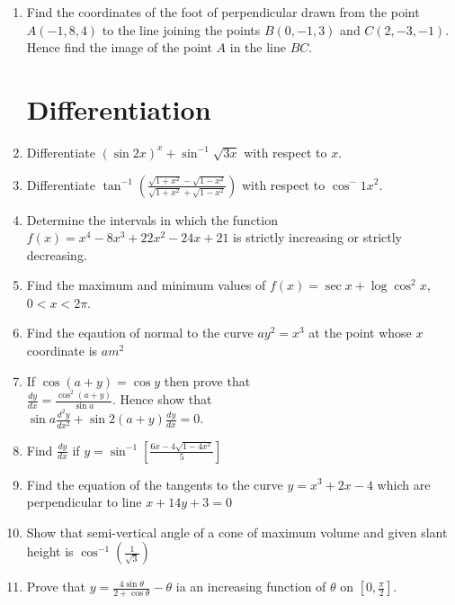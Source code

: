 \documentclass[12pt,-letter paper]{article}
\providecommand{\brak}[1]{\ensuremath{\left(#1\right)}}
\providecommand{\sbrak}[1]{\ensuremath{{}\left[#1\right]}}
\providecommand{\brak}[1]{\ensuremath{\left(#1\right)}}
\begin{document}
\begin{enumerate}
	\item Find the coordinates of the foot of perpendicular drawn from the point
$A(-1, 8, 4)$ to the line joining the points $B(0, -1, 3)$ and $C(2,-3,-1)$. Hence
find the image of the point $A$ in the line $BC$.

	

\section{Differentiation}
	\item Differentiate $(\sin 2x)^x + \sin^{-1} \sqrt{3x}$ with respect to $x$.
	
	\item Differentiate $\tan^{-1} \brak{\frac{\sqrt{1 + x^2}-\sqrt{1-x^2}}{\sqrt{1+x^2}+\sqrt{1-x^2}}}$
with respect to $\cos^-1 x^2$.

	\item Determine the intervals in which the function $f (x) = x^4 - 8x^3 + 22x^2 - 24x+21$ is strictly increasing or strictly decreasing.

	\item Find the maximum and minimum values of $f (x) = \sec x + \log \cos^2 x$, $0 < x < 2\pi$.

	\item Find the eqaution of normal to the curve $ay^2 = x^3$ at the point whose $x$ coordinate is $am^2$
	
	
	\item If $\cos(a+y) = \cos y$ then prove that \\
$\frac{dy}{dx} = \frac{\cos^{2}(a+y)}{\sin a}$. 
Hence show that \\
$\sin a \frac{d^{2}y}{dx^{2}} + \sin 2(a+y)\frac{dy}{dx} = 0 $.

	\item Find $\frac{dy}{dx}$ if $y = \sin^{-1}\sbrak{\frac{6x - 4\sqrt{1-4x^2}}{5}}$ 

	\item Find the equation of the tangents to the curve $y = x^3 + 2x - 4$ which are perpendicular to line $x + 14y + 3 = 0$
	
	\item Show that semi-vertical angle of a cone of maximum volume and given slant height is
$\cos^{-1}\left( \frac{1}{\sqrt{3}} \right)$

	\item Prove that $ y = \frac{4\sin \theta}{2+ \cos \theta} - \theta$ ia an increasing function of $\theta$ on $\sbrak{0,\frac{\pi}{2}}$.




\end{enumerate}
\end{document}

